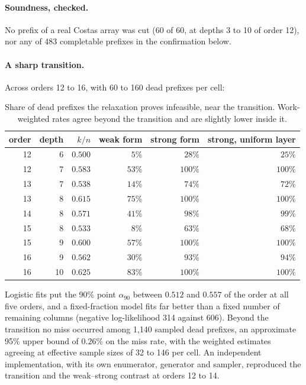 \documentclass[11pt,a4paper,oneside]{report}
\theoremstyle{definition}
\begin{document}
\paragraph{Soundness, checked.} No prefix of a real Costas array was cut (60 of 60, at depths 3 to 10 of order
12), nor any of 483 completable prefixes in the confirmation below.

\paragraph{A sharp transition.} Across orders 12 to 16, with 60 to 160 dead prefixes per cell:

\begin{table}[H]
\centering
\small
\begin{tabular}{@{}rrrrrr@{}}
\toprule
order & depth & $k/n$ & weak form & strong form & strong, uniform layer \\
\midrule
12 & 6 & $0.500$ & $5\%$ & $28\%$ & $25\%$ \\
12 & 7 & $0.583$ & $53\%$ & $100\%$ & $100\%$ \\
13 & 7 & $0.538$ & $14\%$ & $74\%$ & $72\%$ \\
13 & 8 & $0.615$ & $75\%$ & $100\%$ & $100\%$ \\
14 & 8 & $0.571$ & $41\%$ & $98\%$ & $99\%$ \\
15 & 8 & $0.533$ & $8\%$ & $63\%$ & $68\%$ \\
15 & 9 & $0.600$ & $57\%$ & $100\%$ & $100\%$ \\
16 & 9 & $0.562$ & $30\%$ & $93\%$ & $94\%$ \\
16 & 10 & $0.625$ & $83\%$ & $100\%$ & $100\%$ \\
\bottomrule
\end{tabular}
\caption{Share of dead prefixes the relaxation proves infeasible, near the transition. Work-weighted rates
agree beyond the transition and are slightly lower inside it.}
\label{p10-tab:transition}
\end{table}

\noindent Logistic fits put the 90\% point $\alpha_{90}$ between $0.512$ and $0.557$ of the order at all five
orders, and a fixed-fraction model fits far better than a fixed number of remaining columns (negative
log-likelihood 314 against 606). Beyond the transition no miss occurred among 1{,}140 sampled dead
prefixes, an approximate 95\% upper bound of $0.26\%$ on the miss rate, with the weighted estimates agreeing
at effective sample sizes of 32 to 146 per cell. An independent implementation, with its own enumerator,
generator and sampler, reproduced the transition and the weak--strong contrast at orders 12 to 14.
\end{document}
